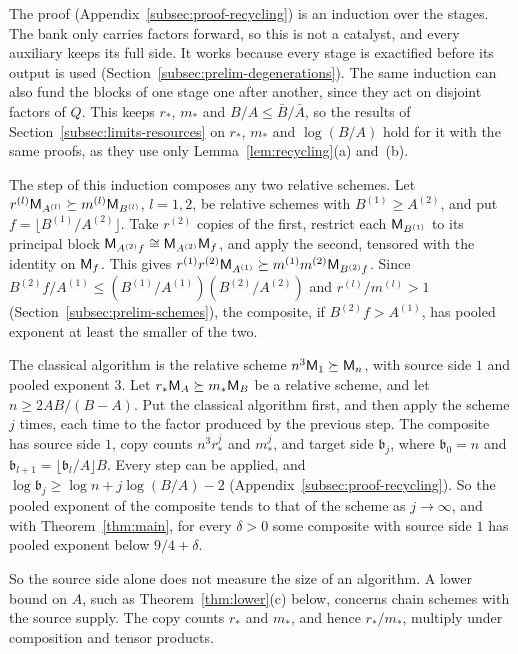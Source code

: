 The proof (Appendix~\ref{subsec:proof-recycling}) is an induction over
the stages. The bank only carries factors forward, so this is not a
catalyst, and every auxiliary keeps its full side. It works because
every stage is exactified before its output is used
(Section~\ref{subsec:prelim-degenerations}). The same induction can also
fund the blocks of one stage one after another, since they act on
disjoint factors of \(Q\). This keeps \(r_*\), \(m_*\) and
\(B/A\le\bar B/\bar A\), so the results of
Section~\ref{subsec:limits-resources} on \(r_*\), \(m_*\) and
\(\log(B/A)\) hold for it with the same proofs, as they use only
Lemma~\ref{lem:recycling}(a) and~(b).

\begin{remark}[Composition]\label{rem:composition}
The step of this induction composes any two relative schemes. Let
\(r^{(l)}\mathsf M_{A^{(l)}}\succeq m^{(l)}\mathsf M_{B^{(l)}}\), \(l=1,2\), be
relative schemes with \(B^{(1)}\ge A^{(2)}\), and put
\(f=\lfloor B^{(1)}/A^{(2)}\rfloor\). Take \(r^{(2)}\) copies of the
first, restrict each \(\mathsf M_{B^{(1)}}\) to its principal block
\(\mathsf M_{A^{(2)}f}\cong\mathsf M_{A^{(2)}}\mathsf M_f\), and apply the second, tensored
with the identity on \(\mathsf M_f\). This gives
\(r^{(1)}r^{(2)}\mathsf M_{A^{(1)}}\succeq m^{(1)}m^{(2)}\mathsf M_{B^{(2)}f}\). Since
\(B^{(2)}f/A^{(1)}\le(B^{(1)}/A^{(1)})(B^{(2)}/A^{(2)})\) and
\(r^{(l)}/m^{(l)}>1\) (Section~\ref{subsec:prelim-schemes}), the
composite, if \(B^{(2)}f>A^{(1)}\), has pooled exponent at least the
smaller of the two.

The classical algorithm is the relative scheme \(n^3\mathsf M_1\succeq\mathsf M_n\),
with source side \(1\) and pooled exponent \(3\). Let
\(r_*\mathsf M_A\succeq m_*\mathsf M_B\) be a relative scheme, and let
\(n\ge2AB/(B-A)\). Put the classical algorithm first, and then apply
the scheme \(j\) times, each time to the factor produced by the previous
step. The composite has source side \(1\), copy counts \(n^3r_*^j\) and
\(m_*^j\), and target side \(\mathfrak b_j\), where \(\mathfrak b_0=n\) and
\(\mathfrak b_{l+1}=\lfloor\mathfrak b_l/A\rfloor B\). Every step can be applied, and
\(\log\mathfrak b_j\ge\log n+j\log(B/A)-2\)
(Appendix~\ref{subsec:proof-recycling}). So the pooled exponent of the
composite tends to that of the scheme as \(j\to\infty\), and with
Theorem~\ref{thm:main}, for every \(\delta>0\) some composite with
source side \(1\) has pooled exponent below \(9/4+\delta\).

So the source side alone does not measure the size of an algorithm. A
lower bound on \(A\), such as Theorem~\ref{thm:lower}(c) below,
concerns chain schemes with the source supply. The copy counts \(r_*\)
and \(m_*\), and hence \(r_*/m_*\), multiply under composition and
tensor products.
\end{remark}

